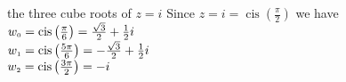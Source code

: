 { the three cube roots of $z = i$}
{ Since $z = i = \operatorname{cis}\left(\frac{\pi}{2}\right)$ we have \\$w_{\text{\tiny$0$}} = \operatorname{cis}\left(\frac{\pi}{6}\right) = \frac{\sqrt{3}}{2} + \frac{1}{2}i$\\$w_{\text{\tiny$1$}} = \operatorname{cis}\left(\frac{5\pi}{6}\right) = -\frac{\sqrt{3}}{2} + \frac{1}{2}i$\\$w_{\text{\tiny$2$}} = \operatorname{cis}\left(\frac{3\pi}{2}\right) = -i$}

